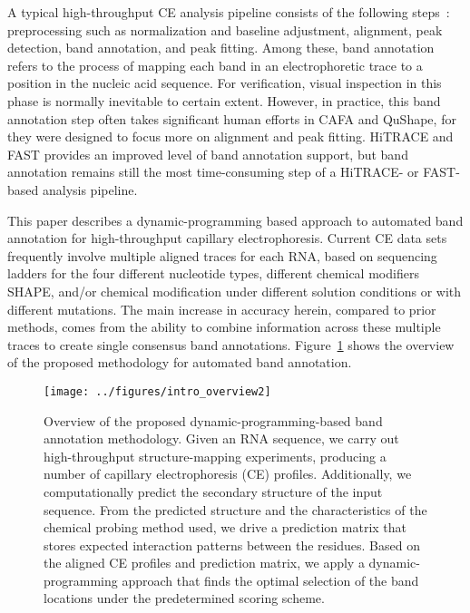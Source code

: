 A typical high-throughput CE analysis pipeline consists of the following steps~\citep{Yoon2011}: preprocessing such as normalization and baseline adjustment, alignment, peak detection, band annotation, and peak fitting. Among these, band annotation refers to the process of mapping each band in an electrophoretic trace to a position in the nucleic acid sequence. For verification, visual inspection in this phase is normally inevitable to certain extent. However, in practice, this band annotation step often takes significant human efforts in CAFA and QuShape, for they were designed to focus more on alignment and peak fitting. HiTRACE and FAST provides an improved level of band annotation support, but band annotation remains still the most time-consuming step of a HiTRACE- or FAST-based analysis pipeline.

This paper describes a dynamic-programming based approach to automated band annotation for high-throughput capillary electrophoresis.
Current CE data sets frequently involve multiple aligned traces for each RNA, based on sequencing ladders for the four different nucleotide types, different chemical modifiers SHAPE, and/or chemical modification under different solution conditions or with different mutations. The main increase in accuracy herein, compared to prior methods, comes from the ability to combine information across these multiple traces  to create single consensus band annotations. Figure~\ref{f:overview} shows the overview of the proposed methodology for automated band annotation.


\begin{figure}
\centering
\texttt{[image: ../figures/intro\_overview2]}
\caption{Overview of the proposed dynamic-programming-based band annotation methodology. Given an RNA sequence, we carry out high-throughput structure-mapping experiments, producing a number of capillary electrophoresis (CE) profiles. Additionally, we computationally predict the secondary structure of the input sequence. From the predicted structure and the characteristics of the chemical probing method used, we drive a prediction matrix that stores expected interaction patterns between the residues. Based on the aligned CE profiles and prediction matrix, we apply a dynamic-programming approach that finds the optimal selection of the band locations under the predetermined scoring scheme.}
\label{f:overview}
\end{figure}


